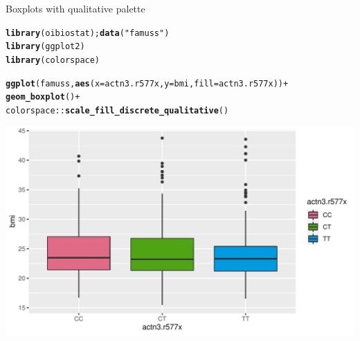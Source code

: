 \documentclass[10pt]{beamer}\usepackage[]{graphicx}\usepackage[]{color}
\makeatletter
\def\maxwidth{ %
  \ifdim\Gin@nat@width>\linewidth
    \linewidth
  \else
    \Gin@nat@width
  \fi
}
\newcommand{\hlstr}[1]{\textcolor[rgb]{0.192,0.494,0.8}{#1}}%
\newcommand{\hlopt}[1]{\textcolor[rgb]{0,0,0}{#1}}%
\newcommand{\hlstd}[1]{\textcolor[rgb]{0.345,0.345,0.345}{#1}}%
\newcommand{\hlkwc}[1]{\textcolor[rgb]{0.333,0.667,0.333}{#1}}%
\newcommand{\hlkwd}[1]{\textcolor[rgb]{0.737,0.353,0.396}{\textbf{#1}}}%
\newenvironment{kframe}{%
 \def\at@end@of@kframe{}%
 \ifinner\ifhmode%
  \def\at@end@of@kframe{\end{minipage}}%
  \begin{minipage}{\columnwidth}%
 \fi\fi%
 \def\FrameCommand##1{\hskip\@totalleftmargin \hskip-\fboxsep
 \colorbox{shadecolor}{##1}\hskip-\fboxsep
     \hskip-\linewidth \hskip-\@totalleftmargin \hskip\columnwidth}%
 \MakeFramed {\advance\hsize-\width
   \@totalleftmargin\z@ \linewidth\hsize
   \@setminipage}}%
 {\par\unskip\endMakeFramed%
 \at@end@of@kframe}
\newenvironment{knitrout}{}{} %
\makeatother
\begin{document}
\begin{frame}[fragile]{Boxplots with qualitative palette}
\begin{knitrout}\tiny
{}\color{fgcolor}\begin{kframe}
\begin{alltt}
\hlkwd{library}\hlstd{(oibiostat);} \hlkwd{data}\hlstd{(}\hlstr{"famuss"}\hlstd{)}
\hlkwd{library}\hlstd{(ggplot2)}
\hlkwd{library}\hlstd{(colorspace)}

\hlkwd{ggplot}\hlstd{(famuss,} \hlkwd{aes}\hlstd{(}\hlkwc{x} \hlstd{= actn3.r577x,} \hlkwc{y} \hlstd{= bmi,} \hlkwc{fill} \hlstd{= actn3.r577x))} \hlopt{+}
\hlkwd{geom_boxplot}\hlstd{()} \hlopt{+}
\hlstd{colorspace}\hlopt{::}\hlkwd{scale_fill_discrete_qualitative}\hlstd{()}
\end{alltt}
\end{kframe}

{\centering \includegraphics[width=\maxwidth]{figure/unnamed-chunk-1-1} 

}



\end{knitrout}
\end{frame}
\end{document}
